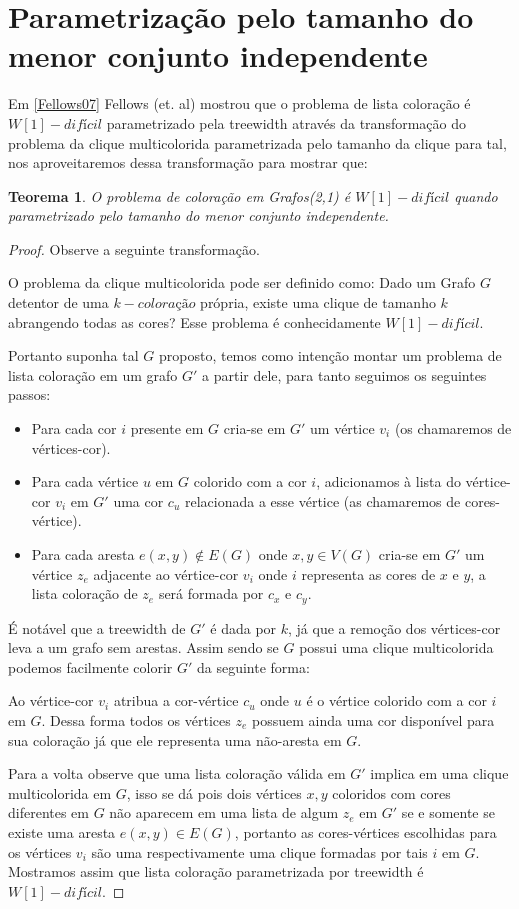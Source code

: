 \documentclass[a4paper,oneside,12pt]{book}
\newtheorem{teorema}{Teorema}
\begin{document}
\section{Parametrização pelo tamanho do menor conjunto independente}
Em \ref{Fellows07} Fellows (et. al) mostrou que o problema de lista coloração é $W[1]-difícil$ parametrizado pela treewidth através da transformação do problema da clique multicolorida parametrizada pelo tamanho da clique para tal, nos aproveitaremos dessa transformação para mostrar que:
\begin{teorema}
O problema de coloração em Grafos(2,1) é $W[1]-difícil$ quando parametrizado pelo tamanho do menor conjunto independente.
\end{teorema}
\begin{proof}
Observe a seguinte transformação.

O problema da clique multicolorida pode ser definido como: Dado um Grafo $G$ detentor de uma $k-coloração$ própria, existe uma clique de tamanho $k$ abrangendo todas as cores? Esse problema é conhecidamente $W[1]-difícil$.

Portanto suponha tal $G$ proposto, temos como intenção montar um problema de lista coloração em um grafo $G'$ a partir dele, para tanto seguimos os seguintes passos:
\begin{itemize}
  \item Para cada cor $i$ presente em $G$ cria-se em $G'$ um vértice $v_i$ (os chamaremos de vértices-cor).
  \item Para cada vértice $u$ em $G$ colorido com a cor $i$, adicionamos à lista do vértice-cor $v_i$ em $G'$ uma cor $c_u$ relacionada a esse vértice (as chamaremos de cores-vértice).
  \item Para cada aresta $e(x,y) \notin E(G)$ onde $x,y \in V(G)$ cria-se em $G'$ um vértice $z_e$ adjacente ao vértice-cor $v_i$ onde $i$ representa as cores de $x$ e $y$, a lista coloração de $z_e$ será formada por $c_x$ e $c_y$.
\end{itemize}
É notável que a treewidth de $G'$ é dada por $k$, já que a remoção dos vértices-cor leva a um grafo sem arestas. Assim sendo se $G$ possui uma clique multicolorida podemos facilmente colorir $G'$ da seguinte forma:

Ao vértice-cor $v_i$ atribua a cor-vértice $c_u$ onde $u$ é o vértice colorido com a cor $i$ em $G$. Dessa forma todos os vértices $z_e$ possuem ainda uma cor disponível para sua coloração já que ele representa uma não-aresta em $G$. 

Para a volta observe que uma lista coloração válida em $G'$ implica em uma clique multicolorida em $G$, isso se dá pois dois vértices $x,y$ coloridos com cores diferentes em $G$ não aparecem em uma lista de algum $z_e$ em $G'$ se e somente se existe uma aresta $e(x,y) \in E(G)$, portanto as cores-vértices escolhidas para os vértices $v_i$ são uma respectivamente uma clique formadas por tais $i$ em $G$. Mostramos assim que lista coloração parametrizada por treewidth é $W[1]-difícil$.


\end{proof}
\end{document}
